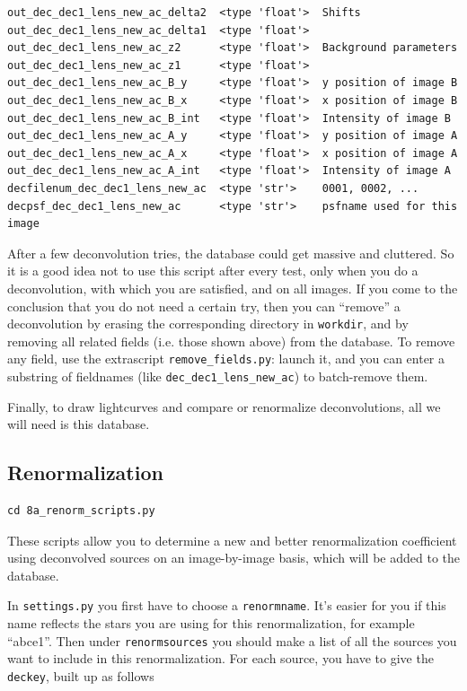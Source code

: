 \begin{Verbatim}[fontsize=\relsize{-2}]
out_dec_dec1_lens_new_ac_delta2  <type 'float'>  Shifts
out_dec_dec1_lens_new_ac_delta1  <type 'float'>  
out_dec_dec1_lens_new_ac_z2      <type 'float'>  Background parameters
out_dec_dec1_lens_new_ac_z1      <type 'float'>
out_dec_dec1_lens_new_ac_B_y     <type 'float'>  y position of image B
out_dec_dec1_lens_new_ac_B_x     <type 'float'>  x position of image B
out_dec_dec1_lens_new_ac_B_int   <type 'float'>  Intensity of image B
out_dec_dec1_lens_new_ac_A_y     <type 'float'>  y position of image A
out_dec_dec1_lens_new_ac_A_x     <type 'float'>  x position of image A
out_dec_dec1_lens_new_ac_A_int   <type 'float'>  Intensity of image A
decfilenum_dec_dec1_lens_new_ac  <type 'str'>    0001, 0002, ...
decpsf_dec_dec1_lens_new_ac      <type 'str'>    psfname used for this image
\end{Verbatim}

After a few deconvolution tries, the database could get massive and cluttered. So it is a good idea not to use this script after every test, only when you do a deconvolution, with which you are satisfied, and on all images. If you come to the conclusion that you do not need a certain try, then you can ``remove'' a deconvolution by erasing the corresponding directory in \verb+workdir+, and by removing all related fields (i.e. those shown above) from the database. To remove any field, use the extrascript \verb+remove_fields.py+: launch it, and you can enter a substring of fieldnames (like \verb+dec_dec1_lens_new_ac+) to batch-remove them.

Finally, to draw lightcurves and compare or renormalize deconvolutions, all we will need is this database.  


\subsection{Renormalization}

\begin{Verbatim}
cd 8a_renorm_scripts.py
\end{Verbatim}

These scripts allow you to determine a new and better renormalization coefficient using deconvolved sources on an image-by-image basis, which will be added to the database.

In \verb+settings.py+ you first have to choose a \verb+renormname+. It's easier for you if this name reflects the stars you are using for this renormalization, for example ``abce1''. Then under \verb+renormsources+ you should make a list of all the sources you want to include in this renormalization. For each source, you have to give the \verb+deckey+, built up as follows 


